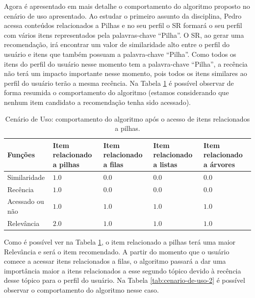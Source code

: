 Agora é apresentado em mais detalhe o comportamento do algoritmo proposto no cenário de uso apresentado.
Ao estudar o primeiro assunto da disciplina, Pedro acessa conteúdos relacionados a Pilhas e no seu perfil
o SR formará o seu perfil com vários itens representados pela palavras-chave ``Pilha''. O SR, ao gerar uma recomendação,
irá encontrar um valor de similaridade alto entre o perfil do usuário e itens que também possuam
a palavra-chave ``Pilha''. Como todos os itens do perfil do usuário nesse momento tem a palavra-chave ``Pilha'', a recência não
terá um impacto importante nesse momento, pois todos os itens similares ao perfil do usuário terão a mesma recência. Na
Tabela \ref{tab:cenario-de-uso-1} é possível observar de forma resumida o comportamento do algoritmo (estamos considerando
que nenhum item candidato a recomendação tenha sido acessado).

\begin{table}[h]
\footnotesize
\caption[Cenário de Uso: comportamento do algoritmo após o acesso de itens relacionados a pilhas.]{Cenário de Uso: comportamento do algoritmo após o acesso de itens relacionados a pilhas.}
\label{tab:cenario-de-uso-1}
\centering
\begin{tabular}{|p{2cm}|p{2.5cm}|p{2.5cm}|p{2.5cm}|p{2.5cm}|}
  \hline
  \textbf{Funções} & \textbf{Item relacionado a pilhas} & \textbf{Item relacionado a filas} & \textbf{Item relacionado a listas} & \textbf{Item relacionado a árvores} \\
  \hline
  Similaridade & $1.0$ & $0.0$ & $0.0$ & $0.0$ \\
  \hline
  Recência & $1.0$ & $0.0$ & $0.0$ & $0.0$ \\
  \hline
  Acessado ou não & $1.0$ & $1.0$ & $1.0$ & $1.0$ \\
  \hline
  Relevância & $2.0$ & $1.0$ & $1.0$ & $1.0$ \\
  \hline
\end{tabular}
\end{table}

Como é possível ver na Tabela \ref{tab:cenario-de-uso-1}, o item relacionado a pilhas terá uma maior
Relevância e será o item recomendado. A partir do momento que o usuário comece a acessar itens relacionados a filas,
o algoritmo passará a dar uma importância maior a itens relacionados a esse segundo tópico devido à recência desse tópico
para o perfil do usuário. Na Tabela \ref{tab:cenario-de-uso-2} é possível observar o comportamento do algoritmo nesse caso.

